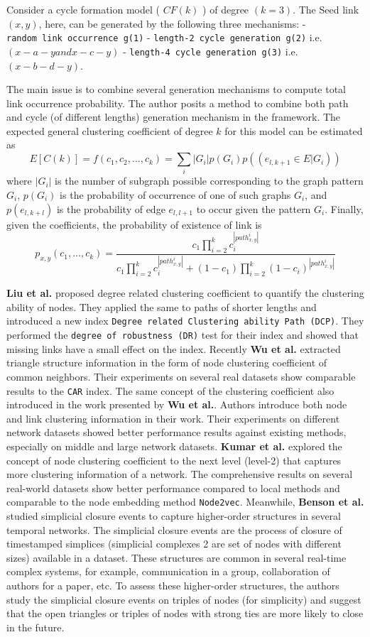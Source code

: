Consider a cycle formation model ( \(CF (k)\) ) of degree \((k = 3)\).
The Seed link \((x, y)\), here, can be generated by the following three
mechanisms: - \texttt{random\ link\ occurrence\ g(1)} -
\texttt{length-2\ cycle\ generation\ g(2)}
i.e.~\((x −a −y and x −c −y)\) -
\texttt{length-4\ cycle\ generation\ g(3)} i.e.~\((x −b −d −y)\).

The main issue is to combine several generation mechanisms to compute
total link occurrence probability. The author posits a method to combine
both path and cycle (of different lengths) generation mechanism in the
framework. The expected general clustering coefficient of degree \(k\)
for this model can be estimated as
\[E[C(k)] = f(c_1, c_2, ..., c_k) = \sum_{i} |G_i|p(G_i)p((e_{l, k+1} \in E|G_i)) \]
where \(|G_i|\) is the number of subgraph possible corresponding to the
graph pattern \(G_i\), \(p(G_i)\) is the probability of occurrence of
one of such graphs \(G_i\), and \(p(e_{l,k+l})\) is the probability of
edge \(e_{l,l+1}\) to occur given the pattern \(G_i\). Finally, given
the coefficients, the probability of existence of link is
\[p_{x,y}(c_1, ..., c_k) = \frac{c_1 \prod_{i=2}^{k} c_i^{|path^i_{x,y}|}}{c_1 \prod_{i=2}^{k} c_i^{|path^i_{x,y}|} + (1-c_1)\prod_{i=2}^{k} (1-c_i)^{|path^i_{x,y}|}}\]

\textbf{Liu et al.} proposed degree related clustering coefficient to
quantify the clustering ability of nodes. They applied the same to paths
of shorter lengths and introduced a new index
\texttt{Degree\ related\ Clustering\ ability\ Path\ (DCP)}. They
performed the \texttt{degree\ of\ robustness\ (DR)} test for their index
and showed that missing links have a small effect on the index. Recently
\textbf{Wu et al.} extracted triangle structure information in the form
of node clustering coefficient of common neighbors. Their experiments on
several real datasets show comparable results to the \texttt{CAR} index.
The same concept of the clustering coefficient also introduced in the
work presented by \textbf{Wu et al.}. Authors introduce both node and
link clustering information in their work. Their experiments on
different network datasets showed better performance results against
existing methods, especially on middle and large network datasets.
\textbf{Kumar et al.} explored the concept of node clustering
coefficient to the next level (level-2) that captures more clustering
information of a network. The comprehensive results on several
real-world datasets show better performance compared to local methods
and comparable to the node embedding method \texttt{Node2vec}.
Meanwhile, \textbf{Benson et al.} studied simplicial closure events to
capture higher-order structures in several temporal networks. The
simplicial closure events are the process of closure of timestamped
simplices (simplicial complexes 2 are set of nodes with different sizes)
available in a dataset. These structures are common in several real-time
complex systems, for example, communication in a group, collaboration of
authors for a paper, etc. To assess these higher-order structures, the
authors study the simplicial closure events on triples of nodes (for
simplicity) and suggest that the open triangles or triples of nodes with
strong ties are more likely to close in the future.

